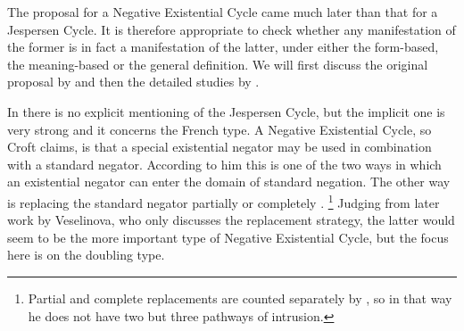﻿\documentclass[output=paper,draft,draftmode,colorlinks,citecolor=brown]{langscibook}
\begin{document}
The proposal for a Negative Existential Cycle came much later than that for
a Jespersen Cycle. It is therefore appropriate to check whether any
manifestation of the former is in fact a manifestation of the latter, under
either the form-based, the meaning-based or the general definition. We will
first discuss the original proposal by \textcite{Croft1991} and then the
detailed studies by
\textcites{Veselinova2010}{Veselinova2013}{Veselinova2014}{Veselinova2015}{Veselinova2016}.

In \citet{Croft1991} there is no explicit mentioning of the Jespersen
Cycle, but the implicit one is very strong and it concerns the French type.
A Negative Existential Cycle, so Croft claims, is that a special
existential negator may be used in combination with a standard negator.
According to him this is one of the two ways in which an existential
negator can enter the domain of standard negation. The other way is
replacing the standard negator partially or completely
\parencite[9--11]{Croft1991}.%
%
    \footnote{Partial and complete replacements are counted separately by
    \textcite{Croft1991}, so in that way he does not have two but three
    pathways of intrusion.} %
%
Judging from later work by
Veselinova, who only discusses the replacement strategy, the latter would
seem to be the more important type of Negative Existential Cycle, but the
focus here is on the doubling type. 
\end{document}
